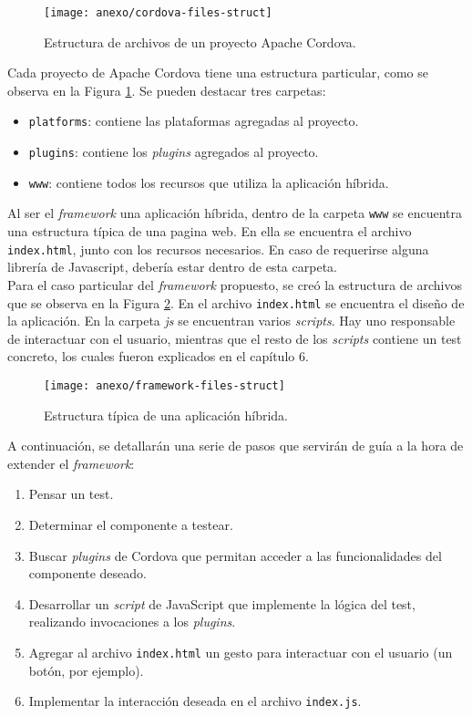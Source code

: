 \begin{figure}[hbtp]
    \centering
	\texttt{[image: anexo/cordova-files-struct]}
	\caption{Estructura de archivos de un proyecto Apache Cordova.}
    \label{fig:anexo:cordova-files-struct}
\end{figure}
Cada proyecto de Apache Cordova tiene una estructura particular, como se observa en la Figura \ref{fig:anexo:cordova-files-struct}. Se pueden destacar tres carpetas:
\begin{itemize}
\item \texttt{platforms}: contiene las plataformas agregadas al proyecto.
\item \texttt{plugins}: contiene los \emph{plugins} agregados al proyecto.
\item \texttt{www}: contiene todos los recursos que utiliza la aplicación híbrida.
\end{itemize}
Al ser el \emph{framework} una aplicación híbrida, dentro de la carpeta \texttt{www} se encuentra una estructura típica de una pagina web. En ella se encuentra el archivo \texttt{index.html}, junto con los recursos necesarios. En caso de requerirse alguna librería de Javascript, debería estar dentro de esta carpeta.\\

Para el caso particular del \emph{framework} propuesto, se creó la estructura de archivos que se observa en la Figura \ref{fig:anexo:framework-files-struct}. En el archivo \texttt{index.html} se encuentra el diseño de la aplicación. En la carpeta \emph{js} se encuentran varios \emph{scripts}. Hay uno responsable de interactuar con el usuario, mientras que el resto de los \emph{scripts} contiene un test concreto, los cuales fueron explicados en el capítulo 6.\\
\begin{figure}[htbp]
    \centering
	\texttt{[image: anexo/framework-files-struct]}
	\caption{Estructura típica de una aplicación híbrida.}
    \label{fig:anexo:framework-files-struct}
\end{figure}

A continuación, se detallarán una serie de pasos que servirán de guía a la hora de extender el \emph{framework}:
\begin{enumerate}
\item Pensar un test.
\item Determinar el componente a testear.
\item Buscar \emph{plugins} de Cordova que permitan acceder a las funcionalidades del componente deseado.
\item Desarrollar un \emph{script} de JavaScript que implemente la lógica del test, realizando invocaciones a los \emph{plugins}.
\item Agregar al archivo \texttt{index.html} un gesto para interactuar con el usuario (un botón, por ejemplo).
\item Implementar la interacción deseada en el archivo \texttt{index.js}.
\end{enumerate}
